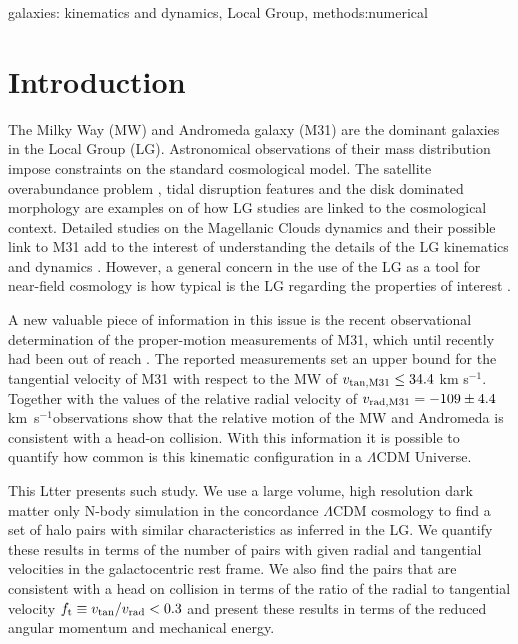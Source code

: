 \documentclass{emulateapj}
\newcommand{\kms}{\,km~s$^{-1}$}
\begin{document}
\begin{keywords}
{galaxies: kinematics and dynamics, Local Group, methods:numerical}
\end{keywords}

\section{Introduction}

The Milky Way (MW) and Andromeda galaxy (M31) are the dominant
galaxies in the Local Group (LG). Astronomical observations of their
mass distribution impose constraints on the standard cosmological
model. The satellite overabundance problem \citep{Klypin99,Moore99},
tidal disruption features \citep{pandas09} and the disk dominated
morphology \citep{Kazantzidis2008} are examples on of how LG studies
are linked to the cosmological context. Detailed studies on the
Magellanic Clouds dynamics and their possible link to M31 add to the
interest of understanding the details of the LG kinematics and
dynamics
\citep{Besla2007,Tollerud2011,Knebe2011,Fouquet2012,Teyssier2012}. However,
a general concern in the use of the LG as a tool for near-field
cosmology \citep{Freeman2002,Peebles2010} is how typical is the LG
regarding the properties of interest
\citep{Busha2011,Liu2011,ForeroRomero2011,Purcell2012}.  

A new valuable piece of information in this issue is the recent
observational determination of the proper-motion measurements of M31,
which until recently had been out of reach \citep{vanderMarel12}.  The
reported measurements set an upper bound for the tangential velocity
of M31 with respect to the MW of $v_{\rm tan,M31}\leq 34.4$ km
s$^{-1}$. Together with the values of the relative radial velocity of
$v_{\rm rad,M31}=-109\pm 4.4$ \kms observations show that the relative
motion of the MW and Andromeda is consistent with a head-on
collision. With this information it is possible to quantify how common
is this kinematic configuration in a $\Lambda$CDM Universe. 

This Ltter presents such study. We use a large volume, high resolution
dark matter only N-body simulation in the concordance $\Lambda$CDM
cosmology to find a set of halo pairs with similar  characteristics as
inferred in the LG. We quantify these results in terms of the number
of pairs with given radial and tangential velocities in the
galactocentric rest frame. We also find the pairs that are consistent
with a head on collision in terms of the ratio of the radial to
tangential velocity $f_{\rm t}\equiv v_{\rm tan}/v_{\rm rad}<0.3$ and
present these results in terms of the reduced angular momentum and
mechanical energy. 
\end{document}
